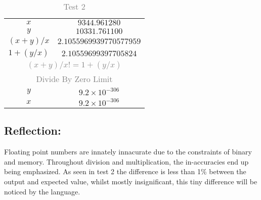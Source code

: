 \documentclass[main.tex]{subfiles}
\begin{document}
            \begin{table}[H]
                \begin{center}
                    \caption{\textcolor{gray}{Test 2}}
                    \begin{tabular}{c c}
                        \hline
                        \(x\) & \(9344.961280\) \\
                        \(y\) & \(10331.761100\) \\
                        \hline
                        \hline
                        \((x + y) / x\) & \(2.1055969939770577959\) \\
                        \(1 + (y / x)\) & \(2.10559699397705824\) \\
                        \multicolumn{2}{c}{\textcolor{gray}{\((x + y) / x != 1 + ( y / x)\)}} \\
                        \hline
                        \hline
                        \multicolumn{2}{c}{\textcolor{gray}{Divide By Zero Limit}} \\
                        \(y\) & \(9.2 \times 10^{-306}\) \\
                        \(x\) & \(9.2 \times 10^{-306}\) \\
                        \hline
                    \end{tabular}
                \end{center}
            \end{table}


        \subsection*{Reflection:}
            Floating point numbers are innately innacurate due to the constraints of binary and memory.
            Throughout division and multiplication, the in-accuracies end up being emphasized. As seen in
            test 2 the difference is less than 1\% between the output and expected value, whilst mostly insignificant,
            this tiny difference will be noticed by the language. 
\end{document}
